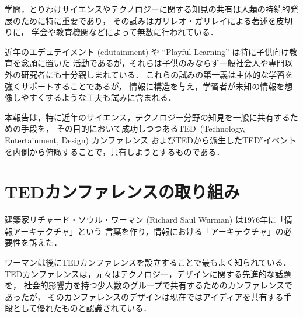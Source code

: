 \documentclass[submit,techreq,jkeyword,noauthor]{ipsj}
\newcommand{\TED}{\textrm{TED}}
\newcommand{\TEDx}{\TED${}^{\textrm{x}}$}
\newcommand{\TEDtitle}{\textbf{TED}}
\begin{document}
学問，とりわけサイエンスやテクノロジーに関する知見の共有は人類の持続的発展のために特に重要であり，
その試みはガリレオ・ガリレイによる著述を皮切りに，
学会や教育機関などによって無数に行われている．\cite{gg}

近年のエデュテイメント (edutainment) や ``Playful Learning'' は特に子供向け教育を念頭に置いた
活動であるが，それらは子供のみならず一般社会人や専門以外の研究者にも十分親しまれている．
これらの試みの第一義は主体的な学習を強くサポートすることであるが，
情報に構造を与え，学習者が未知の情報を想像しやすくするような工夫も試みに含まれる．\cite{nu,mh}

本報告は，特に近年のサイエンス，テクノロジー分野の知見を一般に共有するための手段を，
その目的において成功しつつある\TED\ (Technology, Entertainment, Design) カンファレンス 
および\TED から派生した\TEDx イベントを内側から俯瞰することで，共有しようとするものである．\cite{sugimoto}








\section{\TEDtitle カンファレンスの取り組み}

建築家リチャード・ソウル・ワーマン (Richard Saul Wurman) は1976年に「情報アーキテクチャ」という
言葉を作り，情報における「アーキテクチャ」の必要性を訴えた．\cite{rsw}

ワーマンは後に\TED カンファレンスを設立することで最もよく知られている．
\TED カンファレンスは，元々はテクノロジー，デザインに関する先進的な話題を，
社会的影響力を持つ少人数のグループで共有するためのカンファレンスであったが，
そのカンファレンスのデザインは現在ではアイディアを共有する手段として優れたものと認識されている．\cite{historyofted}
\end{document}
